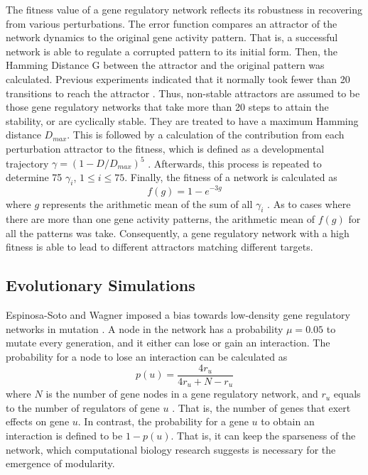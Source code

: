 The fitness value of a gene regulatory network reflects its robustness in recovering from various perturbations. The error function compares an attractor of the network dynamics to the original gene activity pattern. That is, a successful network is able to regulate a corrupted pattern to its initial form. Then, the Hamming Distance G between the attractor and the original pattern was calculated. Previous experiments indicated that it normally took fewer than 20 transitions to reach the attractor \cite{wagner1996does}. Thus, non-stable attractors are assumed to be those gene regulatory networks that take more than 20 steps to attain the stability, or are cyclically stable. They are treated to have a maximum Hamming distance $D_{max}$. This is followed by a calculation of the contribution from each perturbation attractor to the fitness, which is defined as a developmental trajectory $\gamma=(1-D/D_{max})^5$ \cite{espinosa2010specialization}. Afterwards, this process is repeated to determine 75 $\gamma_{i}$, $1 \leq i \leq 75$. Finally, the fitness of a network is calculated as
\begin{equation}
f(g)=1-e^{-3g}
\end{equation}
where $g$ represents the arithmetic mean of the sum of all $\gamma_{i}$ \cite{espinosa2010specialization}. As to cases where there are more than one gene activity patterns, the arithmetic mean of $f(g)$ for all the patterns was take. Consequently, a gene regulatory network with a high fitness is able to lead to different attractors matching different targets. 
\subsection{Evolutionary Simulations}
Espinosa-Soto and Wagner imposed a bias towards low-density gene regulatory networks in mutation \cite{espinosa2010specialization}. A node in the network has a probability $\mu=0.05$ to mutate every generation, and it either can lose or gain an interaction. The probability for a node to lose an interaction can be calculated as
\begin{equation}
p(u)=\frac{4r_{u}}{4r_{u} + N - r_{u}}
\end{equation}
where $N$ is the number of gene nodes in a gene regulatory network, and $r_{u}$ equals to the number of regulators of gene $u$ \cite{espinosa2010specialization}. That is, the number of genes that exert effects on gene $u$. In contrast, the probability for a gene $u$ to obtain an interaction is defined to be $1-p(u)$. That is, it can keep the sparseness of the network, which computational biology research suggests is necessary for the emergence of modularity. 

